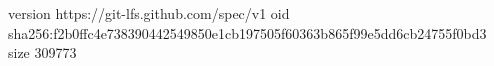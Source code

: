 version https://git-lfs.github.com/spec/v1
oid sha256:f2b0ffc4e738390442549850e1cb197505f60363b865f99e5dd6cb24755f0bd3
size 309773
